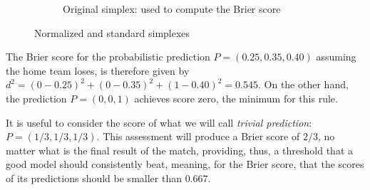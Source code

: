 \documentclass[journal,article,accept,moreauthors,pdftex,12pt,a4paper]{mdpi}
\begin{document}
\begin{figure}[!ht]
\begin{subfigure}[b]{0.48\linewidth}


            \caption{Original simplex: used to compute the Brier score}
            \label{fig:B}
        \end{subfigure}
        \caption{Normalized and standard simplexes}
        \label{fig:norm_stand}
    \end{figure}

    The Brier score for the probabilistic prediction $P=(0.25,0.35,0.40)$
    assuming the home team loses, is therefore given by $d^2=(0-0.25)^2+(0-0.35)^2+(1-0.40)^2=0.545$.
    On the other hand, the prediction $P=(0,0,1)$ achieves score  zero, the minimum for this rule.

    It is useful to consider the score of what we will call {\it trivial prediction}:
    $P=(1/3,1/3,1/3)$.
    This assessment will produce a Brier score of $2/3$, no matter what is the final result of the match, providing, thus, a threshold that a good model should consistently beat, meaning, for the Brier score, that the scores of its predictions should be smaller than $0.667$.
\end{document}
